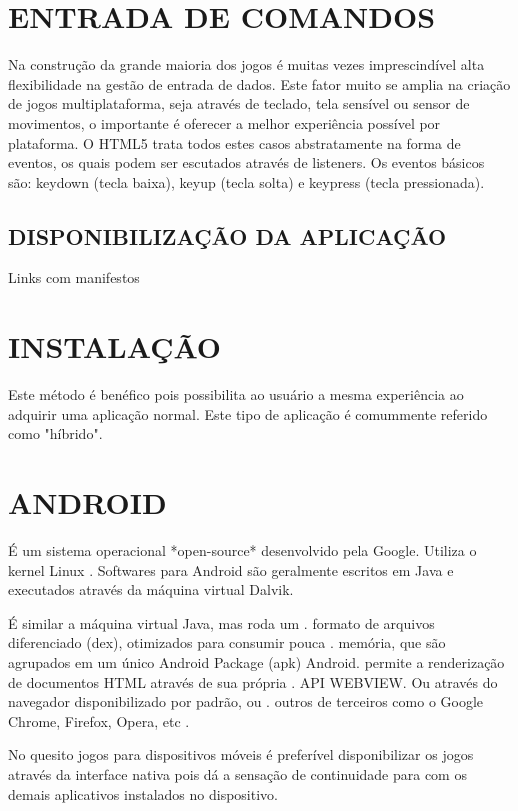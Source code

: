 \documentclass[
12pt,
a4paper,
portuges,
draft
]{report}
\begin{document}
\section{ENTRADA DE COMANDOS}

Na construção da grande maioria dos jogos é muitas vezes
imprescindível alta flexibilidade na gestão de entrada de dados.
Este fator muito se amplia na criação de jogos multiplataforma,
seja através de teclado, tela sensível ou sensor de movimentos, o
importante é oferecer a melhor experiência possível por plataforma.
O HTML5 trata todos estes casos abstratamente na forma de eventos, os
quais podem ser escutados através de listeners. Os eventos básicos
são: keydown (tecla baixa), keyup (tecla solta) e keypress (tecla
pressionada).


\subsection{DISPONIBILIZAÇÃO DA APLICAÇÃO}

Links com manifestos

\section{INSTALAÇÃO}

Este método é benéfico pois possibilita ao usuário a mesma
experiência ao adquirir uma aplicação normal. Este tipo de
aplicação é comummente referido como "híbrido".

\section{ANDROID}

É um sistema operacional *open-source* desenvolvido pela Google.
Utiliza o kernel Linux .
Softwares para Android são geralmente escritos em Java e executados
através da máquina virtual Dalvik.

É similar a máquina virtual Java, mas roda um  .
formato de arquivos diferenciado (dex), otimizados para consumir pouca .
memória, que são agrupados em um único Android Package (apk) Android.
permite a renderização de documentos HTML através de sua própria   .
API WEBVIEW. Ou através do navegador disponibilizado por padrão, ou  .
outros de terceiros como o Google Chrome, Firefox, Opera, etc          .

No quesito jogos para dispositivos móveis é preferível disponibilizar
os jogos através da interface nativa pois dá a sensação de
continuidade para com os demais aplicativos instalados no dispositivo.
\end{document}
